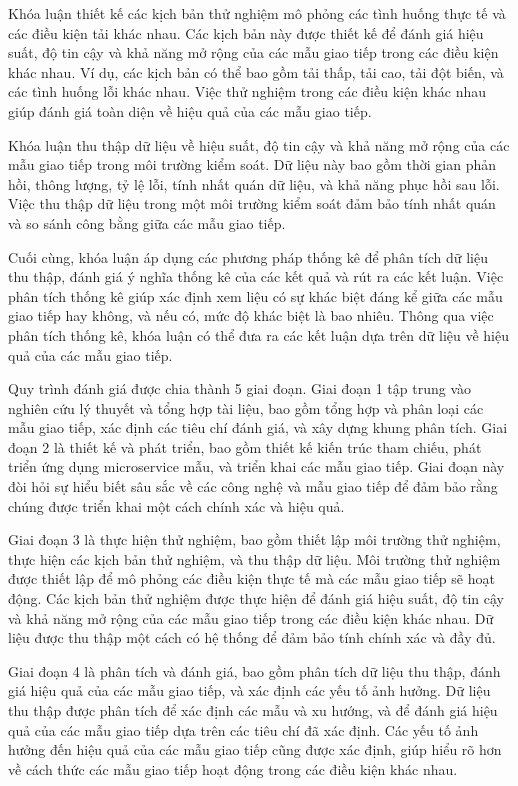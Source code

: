 Khóa luận thiết kế các kịch bản thử nghiệm mô phỏng các tình huống thực tế và các điều kiện tải khác nhau. Các kịch bản này được thiết kế để đánh giá hiệu suất, độ tin cậy và khả năng mở rộng của các mẫu giao tiếp trong các điều kiện khác nhau. Ví dụ, các kịch bản có thể bao gồm tải thấp, tải cao, tải đột biến, và các tình huống lỗi khác nhau. Việc thử nghiệm trong các điều kiện khác nhau giúp đánh giá toàn diện về hiệu quả của các mẫu giao tiếp.

Khóa luận thu thập dữ liệu về hiệu suất, độ tin cậy và khả năng mở rộng của các mẫu giao tiếp trong môi trường kiểm soát. Dữ liệu này bao gồm thời gian phản hồi, thông lượng, tỷ lệ lỗi, tính nhất quán dữ liệu, và khả năng phục hồi sau lỗi. Việc thu thập dữ liệu trong một môi trường kiểm soát đảm bảo tính nhất quán và so sánh công bằng giữa các mẫu giao tiếp.

Cuối cùng, khóa luận áp dụng các phương pháp thống kê để phân tích dữ liệu thu thập, đánh giá ý nghĩa thống kê của các kết quả và rút ra các kết luận. Việc phân tích thống kê giúp xác định xem liệu có sự khác biệt đáng kể giữa các mẫu giao tiếp hay không, và nếu có, mức độ khác biệt là bao nhiêu. Thông qua việc phân tích thống kê, khóa luận có thể đưa ra các kết luận dựa trên dữ liệu về hiệu quả của các mẫu giao tiếp.

Quy trình đánh giá được chia thành 5 giai đoạn. Giai đoạn 1 tập trung vào nghiên cứu lý thuyết và tổng hợp tài liệu, bao gồm tổng hợp và phân loại các mẫu giao tiếp, xác định các tiêu chí đánh giá, và xây dựng khung phân tích. Giai đoạn 2 là thiết kế và phát triển, bao gồm thiết kế kiến trúc tham chiếu, phát triển ứng dụng microservice mẫu, và triển khai các mẫu giao tiếp. Giai đoạn này đòi hỏi sự hiểu biết sâu sắc về các công nghệ và mẫu giao tiếp để đảm bảo rằng chúng được triển khai một cách chính xác và hiệu quả.

Giai đoạn 3 là thực hiện thử nghiệm, bao gồm thiết lập môi trường thử nghiệm, thực hiện các kịch bản thử nghiệm, và thu thập dữ liệu. Môi trường thử nghiệm được thiết lập để mô phỏng các điều kiện thực tế mà các mẫu giao tiếp sẽ hoạt động. Các kịch bản thử nghiệm được thực hiện để đánh giá hiệu suất, độ tin cậy và khả năng mở rộng của các mẫu giao tiếp trong các điều kiện khác nhau. Dữ liệu được thu thập một cách có hệ thống để đảm bảo tính chính xác và đầy đủ.

Giai đoạn 4 là phân tích và đánh giá, bao gồm phân tích dữ liệu thu thập, đánh giá hiệu quả của các mẫu giao tiếp, và xác định các yếu tố ảnh hưởng. Dữ liệu thu thập được phân tích để xác định các mẫu và xu hướng, và để đánh giá hiệu quả của các mẫu giao tiếp dựa trên các tiêu chí đã xác định. Các yếu tố ảnh hưởng đến hiệu quả của các mẫu giao tiếp cũng được xác định, giúp hiểu rõ hơn về cách thức các mẫu giao tiếp hoạt động trong các điều kiện khác nhau.

